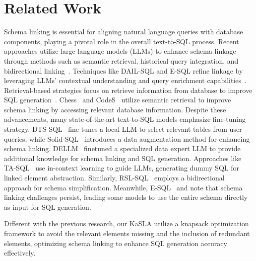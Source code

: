 \section{Related Work}
\label{sec:Related_work}
Schema linking is essential for aligning natural language queries with database components, playing a pivotal role in the overall text-to-SQL process. Recent approaches utilize large language models (LLMs) to enhance schema linkage through methods such as semantic retrieval, historical query integration, and bidirectional linking~\citep{pourreza2024dtssql, cao2024rsl,zhang2024structure}. Techniques like DAIL-SQL and E-SQL refine linkage by leveraging LLMs' contextual understanding and query enrichment capabilities~\citep{gao2023dailsql, caferouglu2024sql}. Retrieval-based strategies focus on retrieve information from database to improve SQL generation~\citep{pourreza2024dtssql}. Chess~\citep{talaei2024chess} and CodeS~\citep{li2024codes} utilize semantic retrieval to improve schema linking by accessing relevant database information.
Despite these advancements, many state-of-the-art text-to-SQL models emphasize fine-tuning strategy. DTS-SQL~\citep{pourreza2024dtssql} fine-tunes a local LLM to select relevant tables from user queries, while Solid-SQL~\citep{liu-etal-2025-solid} introduces a data augmentation method for enhancing schema linking. DELLM~\citep{hong2024knowledge} finetuned a specialized data expert LLM to provide additional knowledge for schema linking and SQL generation. Approaches like TA-SQL~\citep{qu2024before} use in-context learning to guide LLMs, generating dummy SQL for linked element abstraction. Similarly, RSL-SQL~\citep{cao2024rsl} employs a bidirectional approach for schema simplification. Meanwhile, E-SQL~\citep{qu2024before} and  \citep{maamari2024death} note that schema linking challenges persist, leading some models to use the entire schema directly as input for SQL generation. 

Different with the previous research, our KaSLA utilize a knapsack optimization framework to avoid the relevant elements missing and the inclusion of redundant elements, optimizing schema linking to enhance SQL generation accuracy effectively.
